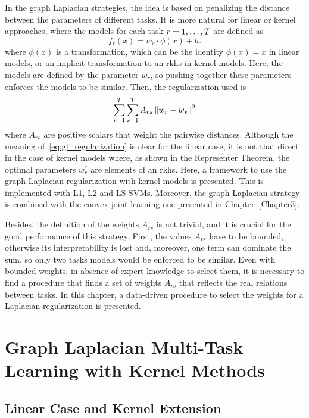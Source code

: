 In the graph Laplacian strategies, the idea is based on penalizing the distance between the parameters of different tasks. It is more natural for linear or kernel approaches, where the models for each task $r=1, \ldots, T$ are defined as
\begin{equation}
    \nonumber
    f_r(x) = w_r \cdot \phi({x}) + b_r
\end{equation}
where $\phi(x)$ is a transformation, which can be the identity $\phi(x)=x$ in linear models, or an implicit transformation to an \acrshort{rkhs} in kernel models.
Here, the models are defined by the parameter $w_r$, so pushing together these parameters enforces the models to be similar. Then, the regularization used is 
\begin{equation}
    \label{eq:gl_regularization}
    \sum_{r=1}^\ntasks \sum_{s=1}^\ntasks A_{rs} \norm{w_r - w_s}^2
\end{equation}
where $A_{rs}$ are positive scalars that weight the pairwise distances.
Although the meaning of~\eqref{eq:gl_regularization} is clear for the linear case, it is not that direct in the case of kernel models where, as shown in the Representer Theorem, the optimal parameters $w_r^*$ are elements of an \acrshort{rkhs}.
Here, a framework to use the graph Laplacian regularization with kernel models is presented. This is implemented with L1, L2 and LS-SVMs. Moreover, the graph Laplacian strategy is combined with the convex joint learning one presented in Chapter~\ref{Chapter3}.
%

Besides, the definition of the weights $A_{rs}$ is not trivial, and it is crucial for the good performance of this strategy. 
First, the values $A_{rs}$ have to be bounded, otherwise its interpretability is lost and, moreover, one term can dominate the sum, so only two tasks models would be enforced to be similar.
%
Even with bounded weights, in absence of expert knowledge to select them, it is necessary to find a procedure that finds a set of weights $A_{rs}$ that reflects the real relations between tasks.
In this chapter, a data-driven procedure to select the weights for a Laplacian regularization is presented.


\section{Graph Laplacian Multi-Task Learning with Kernel Methods}
\subsection{Linear Case and Kernel Extension}
